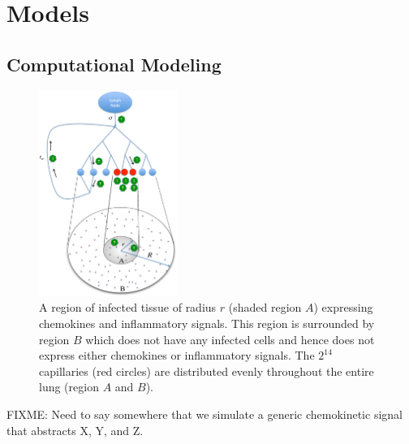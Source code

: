 \documentclass[10pt]{article}
\begin{document}
\section*{Models}

\subsection*{Computational Modeling}

\begin{figure}[ht!]
\begin{center}
\includegraphics[width=0.4\textwidth]{SystemChart}
\end{center}
\caption{A region of infected tissue of radius $r$ (shaded region $A$) expressing chemokines and inflammatory signals. This region is surrounded by region $B$ which does not have any infected cells and hence does not express either chemokines or inflammatory signals. The $2^{14}$ capillaries (red circles) are distributed evenly throughout the entire lung (region $A$ and $B$).}
\label{fig:systemchart}
\end{figure}


FIXME: Need to say somewhere that we simulate a generic chemokinetic signal that abstracts X, Y, and Z.
\end{document}
